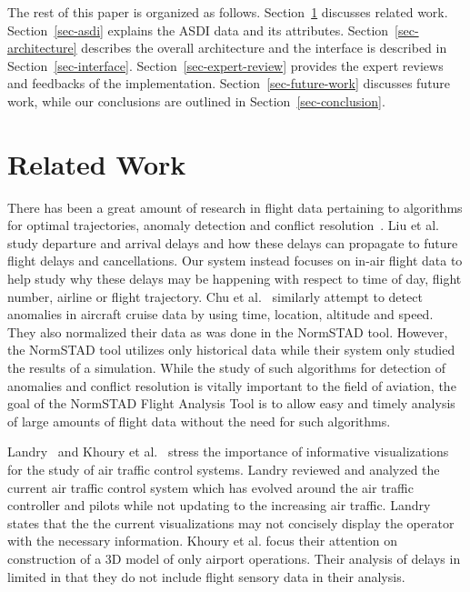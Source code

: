 \documentclass{sig-alternate}
\begin{document}
The rest of this paper is organized as follows. Section~\ref{sec-related-work}
discusses related
work. Section~\ref{sec-asdi} explains the ASDI data and its attributes. 
Section~\ref{sec-architecture} describes
the overall architecture and the interface is described in Section~\ref{sec-interface}.
Section~\ref{sec-expert-review}
provides the expert reviews
and feedbacks of the implementation. Section~\ref{sec-future-work}
discusses future work, while our conclusions
are outlined in Section~\ref{sec-conclusion}.

\section{Related Work}
\label{sec-related-work}

There has been a great amount of research in flight data pertaining to algorithms
for optimal trajectories, anomaly detection and conflict 
resolution~\cite{Basu09, Cao06, Chu10, Liu08, Rama06, Wang04}.
Liu et al.~\cite{Liu08} study departure and arrival delays and how these delays
can propagate to future flight delays and cancellations. Our system instead focuses
on in-air flight data to help study why these delays may be happening with 
respect to time of day, flight number, airline or flight trajectory. 
Chu et al.~\cite{Chu10} similarly
attempt to detect anomalies in aircraft cruise data by using time, location, altitude 
and speed. They also normalized their data as was done in the NormSTAD tool. However,
the NormSTAD tool utilizes only historical data while their system only studied the results
of a simulation. While the study of such algorithms for detection of anomalies and conflict
resolution is vitally important to the field of aviation, the goal of the NormSTAD Flight Analysis 
Tool is to allow easy and timely analysis of large amounts of flight data without the need
for such algorithms.

Landry~\cite{Landry11} and Khoury et al.~\cite{Khoury06} stress the importance
of informative visualizations for the study of air traffic control systems.
Landry reviewed and analyzed the current air traffic control system which 
has evolved around the air traffic controller and pilots while not 
updating to the increasing air traffic. Landry states that the 
the current visualizations may not concisely display the operator with the 
necessary information. Khoury et al. focus their attention on 
construction of a 3D model of only airport operations. Their analysis of delays
in limited in that they do not include flight sensory data in their analysis.
\end{document}
